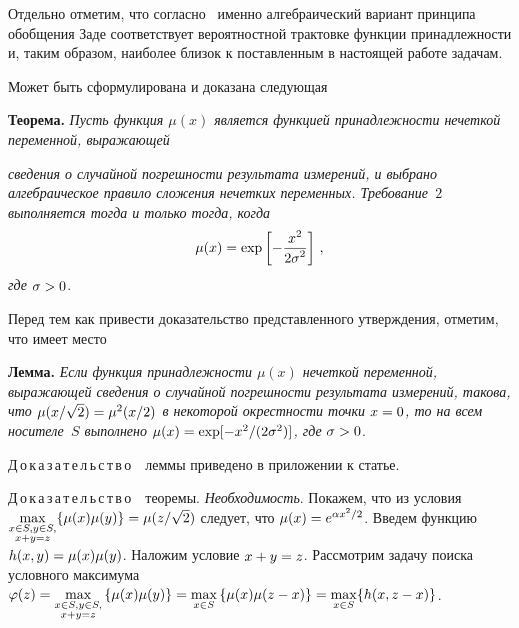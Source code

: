 \begin{multicols}{2}
  Отдельно отметим, что согласно~\cite{11sem} именно алгебраический 
вариант принципа обобщения Заде соответствует вероятностной трактовке 
функции принадлежности и, таким образом, наиболее близок к поставленным в 
настоящей работе задачам.

  
  Может быть сформулирована и доказана следующая
  
  \smallskip
  
  \noindent
  \textbf{Теорема.} \textit{Пусть функция $\mu(x)$ является функцией 
принадлежности нечеткой переменной, выражающей}\linebreak\vspace*{-12pt}

\pagebreak

\noindent
 \textit{сведения о случайной 
погрешности результата измерений, и выбрано алгебраическое правило 
сложения нечетких переменных. Требование~$2$ выполняется тогда и только 
тогда, когда} $$
\mu(x)=\exp\left[ -\displaystyle\frac{\displaystyle x^2\mathstrut}{\displaystyle 2\sigma^2\mathstrut}\right]\,,
$$
\textit{где} 
$\sigma\hm>0$.
  
  \medskip
  
  Перед тем как привести доказательство пред\-став\-лен\-но\-го утверждения, 
отметим, что имеет место
  
  \medskip
  
  \noindent
  \textbf{Лемма.} \textit{Если функция принадлежности $\mu(x)$ нечеткой 
переменной, выражающей сведения о случайной погрешности результата 
измерений, такова, что $\mu(x/\sqrt{2}) \hm = \mu^2(x/2)$ в некоторой 
окрестности точки $x\hm=0$, то на всем носителе~$S$ выполнено 
$\mu(x)\hm=\exp [-x^2/(2\sigma^2)]$, где} $\sigma\hm>0$.
  
  \medskip
  
  \noindent
  Д\,о\,к\,а\,з\,а\,т\,е\,л\,ь\,с\,т\,в\,о\ \ леммы приведено в приложении к статье.
  
  \smallskip
  
  \noindent
  Д\,о\,к\,а\,з\,а\,т\,е\,л\,ь\,с\,т\,в\,о\ \ теоремы. \textit{Необходимость}. 
Покажем, что из условия $\max\limits_{\substack{{x\in S, y\in 
S,}\\{x+y=z}}}\{\mu(x)\mu(y)\}\hm= \mu(z/\sqrt{2})$ следует, что $\mu(x)\hm= 
e^{\alpha x^2/2}$. Введем функцию $h(x,y)\hm=\mu(x)\mu(y)$. Наложим 
условие $x\hm+y\hm=z$. Рассмотрим задачу поиска условного максимума 
$\varphi(z)\hm= \max\limits_{\substack{{x\in S, y\in S,}\\{x+y=z}}}\left\{\mu(x)\mu(y)\right\} \hm= 
\max\limits_{x\in S} \left \{ \mu(x)\mu(z-x)\right\}\hm=
\max\limits_{x\in S} \{h(x,z-x)\}$.
  

\end{multicols}

